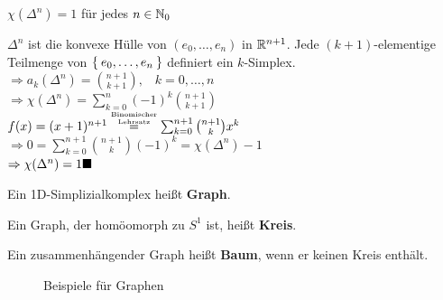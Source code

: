 \begin{bemerkung}
    $\chi(\Delta^n) = 1$ für jedes $n \in \mathbb{N}_0$
\end{bemerkung}

\begin{beweis}
    $\Delta^n$ ist die konvexe Hülle von $(e_0, \dots, e_n)$ in $\mathbb{R}^{n+1}$.
    Jede $(k+1)$-elementige Teilmenge von $\Set{e_0, \dots, e_n}$
    definiert ein $k$-Simplex.\\
    $\Rightarrow a_k(\Delta^n) = \binom{n+1}{k+1}, \;\;\; k = 0, \dots, n$\\
    $\Rightarrow \chi(\Delta^n) = \sum_{k=0}^n (-1)^k \binom{n+1}{k+1}$\\
    $f(x) = (x+1)^{n+1} \overset{\substack{\text{\tiny{Binomischer}}\\\text{\tiny{Lehrsatz}}}}{=} \sum_{k=0}^{n+1} \binom{n+1}{k} x^k$\\
    $\Rightarrow 0 = \sum_{k=0}^{n+1} \binom{n+1}{k} (-1)^k = \chi(\Delta^n) -1$\\
    $\Rightarrow \chi(\Delta^n) = 1 \qed$
\end{beweis}

\begin{definition}%
    \begin{defenum}
        \item Ein 1D-Simplizialkomplex heißt \textbf{Graph}.
        \item Ein Graph, der homöomorph zu $S^1$ ist, heißt \textbf{Kreis}.
        \item Ein zusammenhängender Graph heißt \textbf{Baum},
              wenn er keinen Kreis enthält.
    \end{defenum}
\end{definition}

\begin{figure}[ht]
    \centering

    \subfloat[$K_5$]{
        \parbox[c][3cm]{4cm}{\centering}
        \label{fig:k-5}
    }%
    \subfloat[$K_{3,3}$]{
        \parbox[c][3cm]{4cm}{\centering}
        \label{fig:k-3-3}
    }%
    \caption{Beispiele für Graphen}
    \label{fig:graphen-beispiele}
\end{figure}

